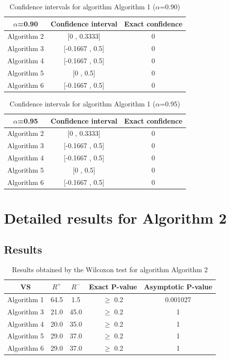 \documentclass[a4paper,10pt]{article}
\begin{document}
\begin{table}[!htp]
\centering\small
\begin{tabular}{
|c|c|c|}
\hline
 $\alpha$=0.90 & Confidence interval & Exact confidence \\ \hline 
Algorithm 2 & [0 , 0.3333] & 0\\ \hline 
Algorithm 3 & [-0.1667 , 0.5] & 0\\ \hline 
Algorithm 4 & [-0.1667 , 0.5] & 0\\ \hline 
Algorithm 5 & [0 , 0.5] & 0\\ \hline 
Algorithm 6 & [-0.1667 , 0.5] & 0\\ \hline 

\end{tabular}
\caption{Confidence intervals for algorithm Algorithm 1 ($\alpha$=0.90)}
\end{table}
\begin{table}[!htp]
\centering\small
\begin{tabular}{
|c|c|c|}
\hline
 $\alpha$=0.95 & Confidence interval & Exact confidence \\ \hline 
Algorithm 2 & [0 , 0.3333] & 0\\ \hline 
Algorithm 3 & [-0.1667 , 0.5] & 0\\ \hline 
Algorithm 4 & [-0.1667 , 0.5] & 0\\ \hline 
Algorithm 5 & [0 , 0.5] & 0\\ \hline 
Algorithm 6 & [-0.1667 , 0.5] & 0\\ \hline 

\end{tabular}
\caption{Confidence intervals for algorithm Algorithm 1 ($\alpha$=0.95)}
\end{table}

 \clearpage 


\section{Detailed results for Algorithm 2}


\subsection{Results}

\begin{table}[!htp]
\centering\small
\begin{tabular}{
|c|c|c|c|c|}
\hline
 VS & $R^{+}$ & $R^{-}$ & Exact P-value & Asymptotic P-value \\ \hline 
Algorithm 1 & 64.5 & 1.5 & $\geq$ 0.2 & 0.001027\\ \hline 
Algorithm 3 & 21.0 & 45.0 & $\geq$ 0.2 & 1\\ \hline 
Algorithm 4 & 20.0 & 35.0 & $\geq$ 0.2 & 1\\ \hline 
Algorithm 5 & 29.0 & 37.0 & $\geq$ 0.2 & 1\\ \hline 
Algorithm 6 & 29.0 & 37.0 & $\geq$ 0.2 & 1\\ \hline 

\end{tabular}
\caption{Results obtained by the Wilcoxon test for algorithm Algorithm 2}
\end{table}
\end{document}
